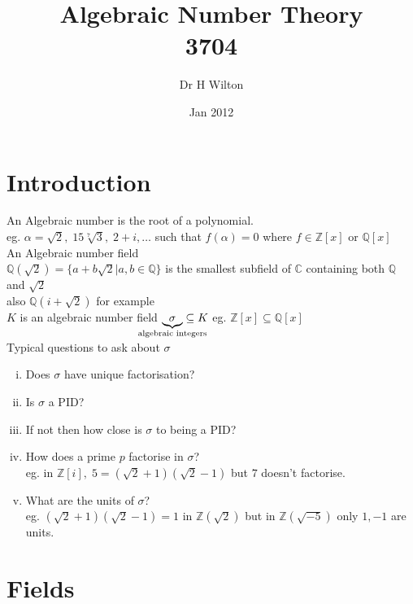 \documentclass[12pt]{article}
\def\CC{\mathbb{C}}
\def\QQ{\mathbb{Q}}
\def\ZZ{\mathbb{Z}}
\begin{document}
\title{Algebraic Number Theory\\ 3704}
\author{Dr H Wilton}
\date{Jan 2012}
\maketitle

\tableofcontents
\setcounter{tocdepth}{4}
\newpage

\section{Introduction}
An Algebraic number is the root of a polynomial. \\
eg. $\alpha = \sqrt{2}, \; 15\sqrt[7]{3}, \; 2 + i , \dots$ such that $f(\alpha ) = 0$ where $f \in \ZZ [x]$ or $\QQ [x]$\\
An Algebraic number field\\
$\QQ (\sqrt{2}) = \{a + b\sqrt{2} | a,b \in \QQ \}$ is the smallest subfield of $\CC$ containing both $\QQ$ and $\sqrt{2}$\\ also $\QQ (i + \sqrt{2})$ for example\\
$K$ is an algebraic number field $\underbrace{\sigma }_{\mathclap{\text{algebraic integers}}} \subseteq K$ eg. $\ZZ [x] \subseteq \QQ [x]$\\
Typical questions to ask about $\sigma$
\begin{enumerate}[(i)]
\item Does $\sigma$ have unique factorisation?
\item Is $\sigma$ a PID?
\item If not then how close is $\sigma$ to being a PID?
\item How does a prime $p$ factorise in $\sigma$?\\
eg. in $\ZZ [i], \; 5=(\sqrt{2} +1)(\sqrt{2} -1)$ but $7$ doesn't factorise.
\item What are the units of $\sigma$?\\
eg. $(\sqrt{2} +1)(\sqrt{2} -1) = 1$ in $\ZZ (\sqrt{2})$ but in $\ZZ (\sqrt{-5})$ only $1,-1$ are units.
\end{enumerate}

\section{Fields}
\end{document}
